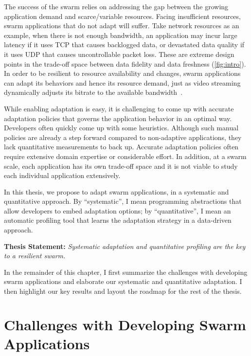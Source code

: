 \documentclass[thesis.tex]{subfiles}
\begin{document}
The success of the swarm relies on addressing the gap between the growing
application demand and scarce/variable resources. Facing insufficient resources,
swarm applications that do not adapt will suffer. Take network resources as an
example, when there is not enough bandwidth, an application may incur large
latency if it uses TCP that causes backlogged data, or devastated data quality
if it uses UDP that causes uncontrollable packet loss. These are extreme design
points in the trade-off space between data fidelity and data freshness
(\autoref{fig:intro}). In order to be resilient to resource availability and
changes, swarm applications can adapt its behaviors and hence its resource
demand, just as video streaming dynamically adjusts its bitrate to the available
bandwidth~\cite{michalos2012dynamic}.

While enabling adaptation is easy, it is challenging to come up with accurate
adaptation policies that governs the application behavior in an optimal
way. Developers often quickly come up with some heuristics. Although such manual
policies are already a step forward compared to non-adaptive applications, they
lack quantitative measurements to back up. Accurate adaptation policies often
require extensive domain expertise or considerable effort. In addition, at a
swarm scale, each application has its own trade-off space and it is not viable
to study each individual application extensively.

In this thesis, we propose to adapt swarm applications, in a systematic and
quantitative approach. By ``systematic'', I mean programming abstractions that
allow developers to embed adaptation options; by ``quantitative'', I mean an
automatic profiling tool that learns the adaptation strategy in a data-driven
approach.

\vspace{1em}

\noindent\textbf{Thesis Statement:} \textit{Systematic adaptation and
  quantitative profiling are the key to a resilient swarm.}

\vspace{1em}

In the remainder of this chapter, I first summarize the challenges with
developing swarm applications and elaborate our systematic and quantitative
adaptation. I then highlight our key results and layout the roadmap for the rest
of the thesis.

\section{Challenges with Developing Swarm Applications}
\label{sec:chall-with-exist}
\end{document}
